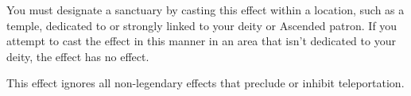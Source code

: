 You must designate a sanctuary by casting this effect within a location, such as a temple, dedicated to or strongly linked to your deity or Ascended patron. If you attempt to cast the effect in this manner in an area that isn’t dedicated to your deity, the effect has no effect.

This effect ignores all non-legendary effects that preclude or inhibit teleportation.




